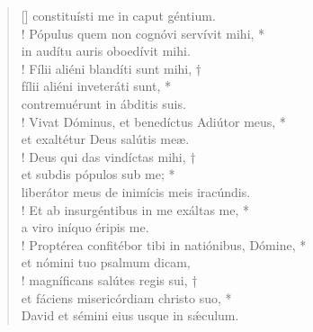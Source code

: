 \begin{verse}[\versewidth]
constituísti me in caput géntium.\\!
\vin Pópulus quem non cognóvi servívit mihi, *\\
\vin in audítu auris oboedívit mihi.\\!
Fílii aliéni blandíti sunt mihi, †\\
fílii aliéni inveteráti sunt, *\\
contremuérunt in ábditis suis.\\!
\vin Vivat Dóminus, et benedíctus Adiútor meus, *\\
\vin et exaltétur Deus salútis meæ.\\!
Deus qui das vindíctas mihi, †\\
et subdis pópulos sub me; *\\
liberátor meus de inimícis meis iracúndis.\\!
\vin Et ab insurgéntibus in me exáltas me, *\\
\vin a viro iníquo éripis me.\\!
Proptérea confitébor tibi in natiónibus, Dómine, *\\
et nómini tuo psalmum dicam,\\!
\vin magníficans salútes regis sui, †\\
\vin et fáciens misericórdiam christo suo, *\\
\vin David et sémini eius usque in s\'{æ}culum.\\
\end{verse}
\vspace{1cm}


